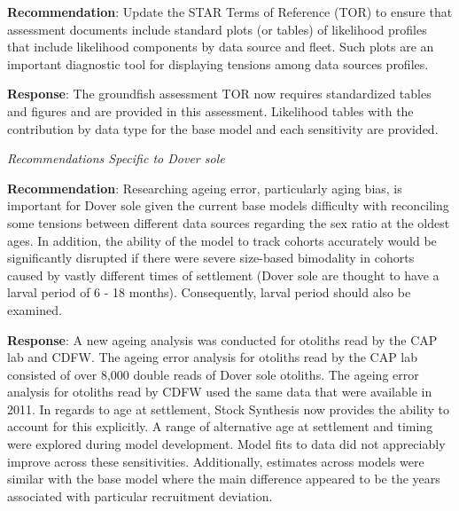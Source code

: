 \documentclass[11pt,
  english,
  a4paper,
]{article}
\begin{document}
\leavevmode\tagmcend\tagstructend\par


\textbf{Recommendation}: Update the STAR Terms of Reference (TOR) to ensure that assessment documents include standard plots (or tables) of likelihood profiles that include likelihood components by data source and fleet. Such plots are an important diagnostic tool for displaying tensions among data sources profiles.

\leavevmode\tagmcend\tagstructend\par


\textbf{Response}: The groundfish assessment TOR now requires standardized tables and figures and are provided in this assessment. Likelihood tables with the contribution by data type for the base model and each sensitivity are provided.

\leavevmode\tagmcend\tagstructend\par


\emph{Recommendations Specific to Dover sole}

\leavevmode\tagmcend\tagstructend\par


\textbf{Recommendation}: Researching ageing error, particularly aging bias, is important for Dover sole given the current base models difficulty with reconciling some tensions between different data sources regarding the sex ratio at the oldest ages. In addition, the ability of the model to track cohorts accurately would be significantly disrupted if there were severe size-based bimodality in cohorts caused by vastly different times of settlement (Dover sole are thought to have a larval period of 6 - 18 months). Consequently, larval period should also be examined.

\leavevmode\tagmcend\tagstructend\par


\textbf{Response}: A new ageing analysis was conducted for otoliths read by the CAP lab and CDFW. The ageing error analysis for otoliths read by the CAP lab consisted of over 8,000 double reads of Dover sole otoliths. The ageing error analysis for otoliths read by CDFW used the same data that were available in 2011. In regards to age at settlement, Stock Synthesis now provides the ability to account for this explicitly. A range of alternative age at settlement and timing were explored during model development. Model fits to data did not appreciably improve across these sensitivities. Additionally, estimates across models were similar with the base model where the main difference appeared to be the years associated with particular recruitment deviation.
\end{document}
